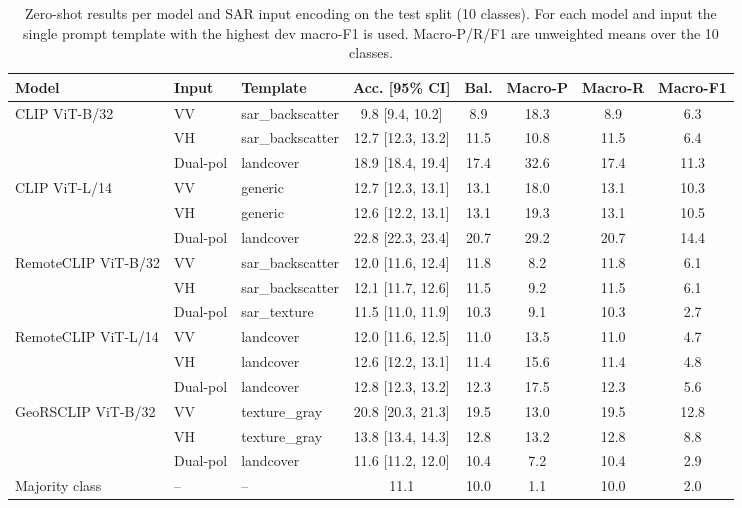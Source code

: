 \begin{table}[t]
\centering
\scriptsize
\caption{Zero-shot results per model and SAR input encoding on the test split (10 classes). For each model and input the single prompt template with the highest dev macro-F1 is used. Macro-P/R/F1 are unweighted means over the 10 classes.}
\label{tab:models}
\begin{tabular*}{\hsize}{@{\extracolsep{\fill}}lllccccc@{}}
\toprule
Model & Input & Template & Acc. [95\% CI] & Bal. & Macro-P & Macro-R & Macro-F1 \\
\midrule
CLIP ViT-B/32 & VV & sar\_backscatter & 9.8 [9.4, 10.2] & 8.9 & 18.3 & 8.9 & 6.3 \\
 & VH & sar\_backscatter & 12.7 [12.3, 13.2] & 11.5 & 10.8 & 11.5 & 6.4 \\
 & Dual-pol & landcover & 18.9 [18.4, 19.4] & 17.4 & 32.6 & 17.4 & 11.3 \\
\midrule
CLIP ViT-L/14 & VV & generic & 12.7 [12.3, 13.1] & 13.1 & 18.0 & 13.1 & 10.3 \\
 & VH & generic & 12.6 [12.2, 13.1] & 13.1 & 19.3 & 13.1 & 10.5 \\
 & Dual-pol & landcover & 22.8 [22.3, 23.4] & 20.7 & 29.2 & 20.7 & 14.4 \\
\midrule
RemoteCLIP ViT-B/32 & VV & sar\_backscatter & 12.0 [11.6, 12.4] & 11.8 & 8.2 & 11.8 & 6.1 \\
 & VH & sar\_backscatter & 12.1 [11.7, 12.6] & 11.5 & 9.2 & 11.5 & 6.1 \\
 & Dual-pol & sar\_texture & 11.5 [11.0, 11.9] & 10.3 & 9.1 & 10.3 & 2.7 \\
\midrule
RemoteCLIP ViT-L/14 & VV & landcover & 12.0 [11.6, 12.5] & 11.0 & 13.5 & 11.0 & 4.7 \\
 & VH & landcover & 12.6 [12.2, 13.1] & 11.4 & 15.6 & 11.4 & 4.8 \\
 & Dual-pol & landcover & 12.8 [12.3, 13.2] & 12.3 & 17.5 & 12.3 & 5.6 \\
\midrule
GeoRSCLIP ViT-B/32 & VV & texture\_gray & 20.8 [20.3, 21.3] & 19.5 & 13.0 & 19.5 & 12.8 \\
 & VH & texture\_gray & 13.8 [13.4, 14.3] & 12.8 & 13.2 & 12.8 & 8.8 \\
 & Dual-pol & landcover & 11.6 [11.2, 12.0] & 10.4 & 7.2 & 10.4 & 2.9 \\
\midrule
Majority class & -- & -- & 11.1 & 10.0 & 1.1 & 10.0 & 2.0 \\
\bottomrule
\end{tabular*}
\end{table}
